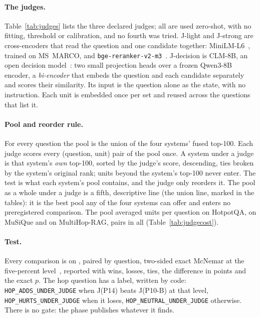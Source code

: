 \paragraph{The judges.} Table~\ref{tab:judges} lists the three declared judges; all are used
zero-shot, with no fitting, threshold or calibration, and no fourth was tried. J-light and
J-strong are cross-encoders that read the question and one candidate together:
MiniLM-L6~\citep{wang2020minilm,reimers2021msmarcominilm}, trained on MS~MARCO, and
\texttt{bge-reranker-v2-m3}~\citep{bge2024rerankerv2m3,chen2024m3}. J-decision is CLM-8B, an
open decision model~\citep{kwok2026clm}: two small projection heads over a frozen
Qwen3-8B~\citep{yang2025qwen3} encoder, a \emph{bi-encoder} that embeds the question and each
candidate separately and scores their similarity. Its input is the question alone as the state,
with no instruction. Each unit is embedded once per set and reused across the questions that
list it.

\begin{table}[t]
\centering
\small
\caption{\capJudges}
\label{tab:judges}
\end{table}

\paragraph{Pool and reorder rule.} For every question the pool is the union of the four systems'
fused top-100. Each judge scores every (question, unit) pair of the pool once. A system under a
judge is that system's \emph{own} top-100, sorted by the judge's score, descending, ties broken
by the system's original rank; units beyond the system's top-100 never enter. The test is what
each system's pool contains, and the judge only reorders it. The pool as a whole under a judge
is a fifth, descriptive line (the union line, marked in the tables): it is the best pool any of
the four systems can offer and enters no preregistered comparison. The pool averaged
\poolMeanHotpot{} units per question on HotpotQA, \poolMeanMusique{} on MuSiQue and
\poolMeanMultihop{} on MultiHop-RAG, \pairsTotal{} pairs in all (Table~\ref{tab:judgecost}).

\paragraph{Test.} Every comparison is on \FS, paired by question, two-sided exact McNemar at
the five-percent level~\citep{mcnemar1947note}, reported with wins, losses, ties, the difference in
points and the exact $p$. The hop question has a label, written by code: \texttt{HOP\_ADDS\_UNDER\_JUDGE}
when J(P14) beats J(P10-B) at that level, \texttt{HOP\_HURTS\_UNDER\_JUDGE} when it loses,
\texttt{HOP\_NEUTRAL\_UNDER\_JUDGE} otherwise. There is no gate: the phase publishes whatever it finds.

